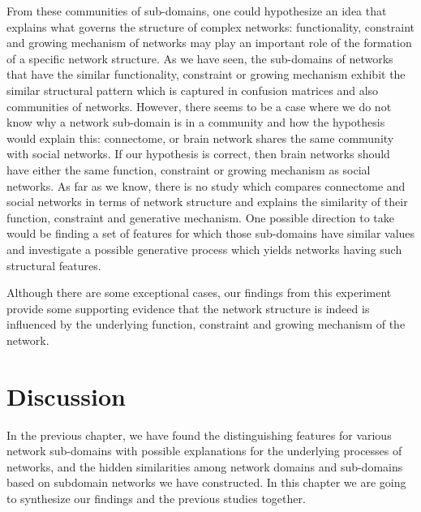 \documentclass{article}
\begin{document}
From these communities of sub-domains, one could hypothesize an idea that explains what governs the structure of complex networks: functionality, constraint and growing mechanism of networks may play an important role of the formation of a specific network structure. As we have seen, the sub-domains of networks that have the similar functionality, constraint or growing mechanism exhibit the similar structural pattern which is captured in confusion matrices and also communities of networks. However, there seems to be a case where we do not know why a network sub-domain is in a community and how the hypothesis would explain this: connectome, or brain network shares the same community with social networks. If our hypothesis is correct, then brain networks should have either the same function, constraint or growing mechanism as social networks. As far as we know, there is no study which compares connectome and social networks in terms of network structure and explains the similarity of their function, constraint and generative mechanism. One possible direction to take would be finding a set of features for which those sub-domains have similar values and investigate a possible generative process which yields networks having such structural features.

Although there are some exceptional cases, our findings from this experiment provide some supporting evidence that the network structure is indeed is influenced by the underlying function, constraint and growing mechanism of the network.


\newpage
\section{Discussion}
In the previous chapter, we have found the distinguishing features for various network sub-domains with possible explanations for the underlying processes of networks, and the hidden similarities among network domains and sub-domains based on subdomain networks we have constructed. In this chapter we are going to synthesize our findings and the previous studies together.
\end{document}
